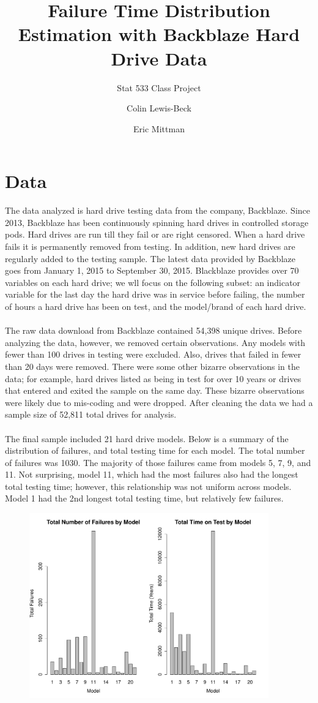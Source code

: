 \documentclass{scrartcl}
\title{Failure Time Distribution Estimation with Backblaze Hard Drive Data}
\subtitle{Stat 533 Class Project}
\author{Colin Lewis-Beck\\
  \and
  Eric Mittman}
\begin{document}
\noindent
\maketitle
\section*{Data}
The data analyzed is hard drive testing data from the company, Backblaze.  Since 2013, Backblaze has been continuously spinning hard drives in controlled storage pods.  Hard drives are run till they fail or are right censored.  When a hard drive fails it is permanently removed from testing.  In addition, new hard drives are regularly added to the testing sample.  The latest data provided by Backblaze goes from January 1, 2015 to September 30, 2015.  Blackblaze provides over 70 variables on each hard drive; we wll focus on the following subset: an indicator variable for the last day the hard drive was in service before failing, the number of hours a hard drive has been on test, and the model/brand of each hard drive.\\\\
The raw data download from Backblaze contained 54,398 unique drives.  Before analyzing the data, however, we removed certain observations.  Any models with fewer than 100 drives in testing were excluded.  Also, drives that failed in fewer than 20 days were removed.  There were some other bizarre observations in the data; for example, hard drives listed as being in test for over 10 years or drives that entered and exited the sample on the same day.  These bizarre observations were likely due to mis-coding and were dropped.  After cleaning the data we had a sample size of 52,811 total drives for analysis.\\\\
The final sample included 21 hard drive models.  Below is a summary of the distribution of failures, and total testing time for each model.  The total number of failures was 1030.  The majority of those failures came from models 5, 7, 9, and 11.  Not surprising, model 11, which had the most failures also had the longest total testing time; however, this relationship was not uniform across models.  Model 1 had the 2nd longest total testing time, but relatively few failures.
\begin{figure}[H]
\centering
\includegraphics[height=8cm]{sumstat1.pdf}
\end{figure}
\end{document}
